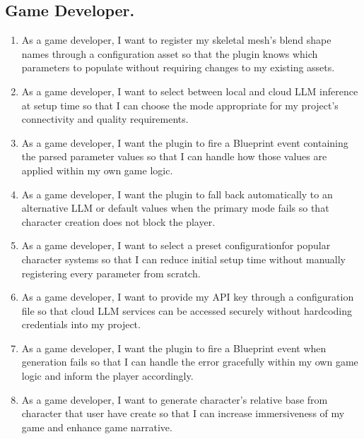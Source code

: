 \subsection{Game Developer.}
\begin{enumerate}[label=\textbf{US-D-\arabic*.}, leftmargin=*, align=left]
    
    \item As a game developer, I want to register my skeletal mesh's blend shape names through a configuration asset so that the plugin knows which parameters to populate without requiring changes to my existing assets.
    
    \item As a game developer, I want to select between local and cloud LLM inference at setup time so that I can choose the mode appropriate for my project's connectivity and quality requirements.
    
    \item As a game developer, I want the plugin to fire a Blueprint event containing the parsed parameter values so that I can handle how those values are applied within my own game logic.
    
    \item As a game developer, I want the plugin to fall back automatically to an alternative LLM or default values when the primary mode fails so that character  creation does not block the player.
    
    \item As a game developer, I want to select a preset configurationfor popular character systems so that I can reduce initial setup time without manually registering every parameter from scratch.
    
    \item As a game developer, I want to provide my API key through a configuration file so that cloud LLM services can be accessed securely without hardcoding credentials into my project.
    
    \item As a game developer, I want the plugin to fire a Blueprint event when generation fails so that I can handle the error gracefully within my own game logic and inform the player accordingly.

    \item As a game developer, I want to generate character's relative base from character that user have create so that I can increase immersiveness of my game and enhance game narrative.
\end{enumerate}

